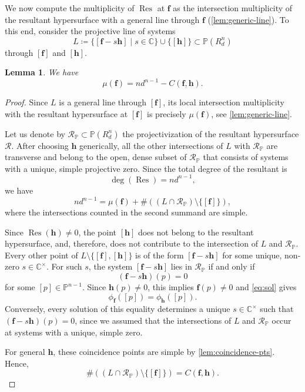 \documentclass[11pt,letterpaper]{article}
\newtheorem{lemma}[theorem]{Lemma}\AddToHook{env/lemma/begin}{\crefalias{theorem}{lemma}}
\numberwithin{equation}{section}
\newcommand{\PP}{\mathbb{P}}
\newcommand{\CC}{\mathbb{C}}
\newcommand{\cR}{\mathcal{R}}
\newcommand{\ff}{\ensuremath{\boldsymbol{f}}}
\newcommand{\hh}{\ensuremath{\boldsymbol{h}}}
\DeclareMathOperator{\Res}{Res}
\begin{document}
We now compute the multiplicity of $\Res$ at $\ff$ as the intersection multiplicity of the resultant hypersurface with a general line through $\ff$ (\cref{lem:generic-line}).
To this end, consider the projective line of systems \[
L \coloneqq \{[\ff - s \hh] \mid s\in \CC\}\cup \{[\hh]\} \subset \PP(R_d^n)
\] through $[\ff]$ and $[\hh]$.

\begin{lemma}
\label{lem:count}
We have \[
\mu(\ff) = n d^{n-1} - C(\ff,\hh).
\]
\end{lemma}
\begin{proof}
Since $L$ is a general line through $[\ff]$, its local intersection multiplicity with the resultant hypersurface at $[\ff]$ is precisely $\mu(\ff)$, see \cref{lem:generic-line}.

Let us denote by $\cR_{\PP}\subset\PP(R_d^n)$ the projectivization of the resultant hypersurface $\cR$.
After choosing $\hh$ generically, all the other intersections of $L$ with $\cR_{\PP}$ are transverse and belong to the open, dense subset of $\cR_{\PP}$ that consists of systems with a unique, simple projective zero.
Since the total degree of the resultant is \[
\deg(\Res) = n d^{n-1},
\] 
we have \[
nd^{n-1} = \mu(\ff) + \# \left((L\cap \cR_{\PP})\setminus \{[\ff]\}\right),
\] where the intersections counted in the second summand are simple.

Since $\Res(\hh)\neq 0$, the point $[\hh]$ does not belong to the resultant hypersurface, and, therefore, does not contribute to the intersection of $L$ and $\cR_{\PP}$.
Every other point of $L\setminus\{[\ff],[\hh]\}$ is of the form $[\ff-s\hh]$ for some unique, non-zero $s\in\CC^{\times}$.
For such $s$, the system $[\ff-s\hh]$ lies in $\cR_{\PP}$ if and only if \begin{equation}
    \label{eq:sol}
 (\ff - s \hh)(p)=0
\end{equation} for some $[p]\in\PP^{n-1}$. 
Since $\hh(p)\neq 0$, this implies $\ff(p)\neq 0$ and \cref{eq:sol} gives \[
\phi_{\ff}([p]) = \phi_{\hh}([p]). 
\]
Conversely, every solution of this equality determines a unique $s\in\CC^{\times}$ such that $(\ff-s\hh)(p)=0$, since we assumed that the intersections of $L$ and $\cR_{\PP}$ occur at systems with a unique, simple zero. 

For general $\hh$, these coincidence points are simple by \cref{lem:coincidence-pts}.
Hence,  \[
 \#\left((L\cap \cR_{\PP})\setminus \{[\ff]\}\right) = C(\ff,\hh).
\]
\end{proof}
\end{document}
